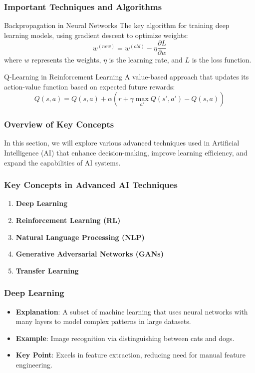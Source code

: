 \documentclass[aspectratio=169]{beamer}
\begin{document}
\begin{frame}[fragile]
    \frametitle{Important Techniques and Algorithms}
    \begin{block}{Backpropagation in Neural Networks}
        The key algorithm for training deep learning models, using gradient descent to optimize weights:
        \begin{equation}
            w^{(new)} = w^{(old)} - \eta \frac{\partial L}{\partial w}
        \end{equation}
        where \( w \) represents the weights, \( \eta \) is the learning rate, and \( L \) is the loss function.
    \end{block}

    \begin{block}{Q-Learning in Reinforcement Learning}
        A value-based approach that updates its action-value function based on expected future rewards:
        \begin{equation}
            Q(s, a) = Q(s, a) + \alpha \left( r + \gamma \max_{a'} Q(s', a') - Q(s, a) \right)
        \end{equation}
    \end{block}
\end{frame}

\begin{frame}[fragile]
    \frametitle{Overview of Key Concepts}
    In this section, we will explore various advanced techniques used in Artificial Intelligence (AI) that enhance decision-making, improve learning efficiency, and expand the capabilities of AI systems.
\end{frame}

\begin{frame}[fragile]
    \frametitle{Key Concepts in Advanced AI Techniques}
    \begin{enumerate}
        \item \textbf{Deep Learning}
        \item \textbf{Reinforcement Learning (RL)}
        \item \textbf{Natural Language Processing (NLP)}
        \item \textbf{Generative Adversarial Networks (GANs)}
        \item \textbf{Transfer Learning}
    \end{enumerate}
\end{frame}

\begin{frame}[fragile]
    \frametitle{Deep Learning}
    \begin{itemize}
        \item \textbf{Explanation}: A subset of machine learning that uses neural networks with many layers to model complex patterns in large datasets.
        \item \textbf{Example}: Image recognition via distinguishing between cats and dogs.
        \item \textbf{Key Point}: Excels in feature extraction, reducing need for manual feature engineering.
    \end{itemize}
\end{frame}
\end{document}
